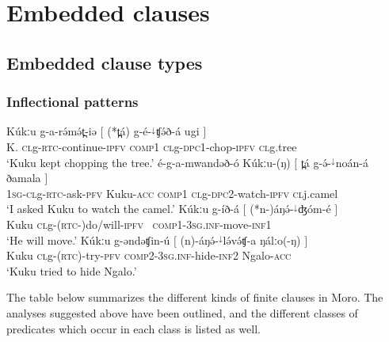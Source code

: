 \chapter{Embedded clauses}\label{chapter:embeddedclauses}


\section{Embedded clause types}\label{sec:ch15:clausetypes}


\subsection{Inflectional patterns}

\ea  \gll  Kúkːu	g-a-rə́mə́t̪-iə      $[$    (*t̪á)     g-{é}-$^{↓}$ʧə́ð-á                   ugi  $]$	\\
K. \textsc{cl}g-\textsc{rtc}-continue-\textsc{ipfv}  {}  \textsc{comp1} \textsc{cl}g-\textsc{dpc1}-chop-\textsc{ipfv}  \textsc{cl}g.tree {} {}\\
\glt ‘Kuku kept chopping the tree.’
\ex \gll 	é-g-a-mwandəð-ó Kúkːu-(ŋ)   $[$ t̪á g-{ə́}-$^{↓}$noán-á ðamala $]$\\
 \textsc{1sg}-\textsc{cl}g-\textsc{rtc}-ask-\textsc{pfv} Kuku-\textsc{acc} {} \textsc{comp1} \textsc{cl}g-\textsc{dpc2}-watch-\textsc{ipfv} \textsc{cl}j.camel {}\\
\glt ‘I asked Kuku to watch the camel.’
\z 
{}
\ea  \gll  Kúkːu g-íð-á $[$ (*n-)áŋə́-$^{↓}$ʤóm-é $]$ \\
Kuku \textsc{cl}g-(\textsc{rtc}-)do/will-\textsc{ipfv} {} {\ \textsc{comp1}}-\textsc{3sg.inf}-move-\textsc{inf1} {}\\
\glt ‘He will move.’ \label{2a}
\ex  \gll  	Kúkːu  g-əndəʧin-ú   $[$     (n)-áŋə́-$^{↓}$lə́və́ʧ-a              ŋálːo(-ŋ) $]$ \\
 	Kuku  \textsc{cl}g-(\textsc{rtc})-try-\textsc{pfv}   {}  \textsc{comp2-3sg.inf}-hide-\textsc{inf2}  Ngalo-\textsc{acc} {}\\
\glt   ‘Kuku tried to hide Ngalo.' \label{2b}
\z 
\z 

The table below summarizes the different kinds of finite clauses in Moro. The analyses suggested above have been outlined, and the different classes of predicates which occur in each class is listed as well.

